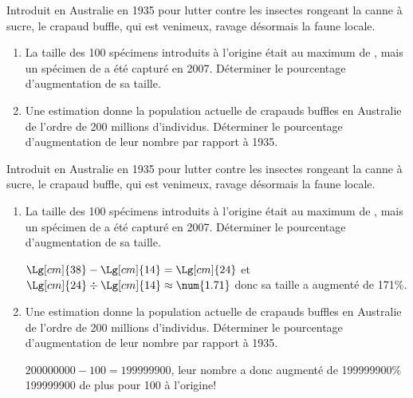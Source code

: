 \begin{exercice*}
    Introduit en Australie en 1935 pour lutter contre les insectes rongeant la canne à sucre, le crapaud buffle, qui est venimeux, ravage désormais la faune locale.
    \begin{enumerate}
        \item La taille des 100 spécimens introduits à l'origine était au maximum de , mais un spécimen de  a été capturé en 2007.
        Déterminer le pourcentage d'augmentation de sa taille.
        \item Une estimation donne la population actuelle de crapauds buffles en Australie de l'ordre de 200 millions d'individus.
        Déterminer le pourcentage d'augmentation de leur nombre par rapport à 1935.
    \end{enumerate}
\end{exercice*}
\begin{corrige}
    Introduit en Australie en 1935 pour lutter contre les insectes rongeant la canne à sucre, le crapaud buffle, qui est venimeux, ravage désormais la faune locale.

    \begin{enumerate}
        \item La taille des 100 spécimens introduits à l'origine était au maximum de , mais un spécimen de  a été capturé en 2007.
        Déterminer le pourcentage d'augmentation de sa taille.

        {\color{red} $\Lg[cm]{38}-\Lg[cm]{14}=\Lg[cm]{24}$ et $\Lg[cm]{24}\div\Lg[cm]{14}\approx\num{1.71}$ donc sa taille a augmenté de 171\%.}
        \item Une estimation donne la population actuelle de crapauds buffles en Australie de l'ordre de 200 millions d'individus.
        Déterminer le pourcentage d'augmentation de leur nombre par rapport à 1935.

        {\color{red} $\num{200 000 000}-100=\num{199 999 900}$, leur nombre a donc augmenté de \num{199 999 900}\% \num{199 999 900} de plus pour 100 à l'origine!}
    \end{enumerate}
\end{corrige}
